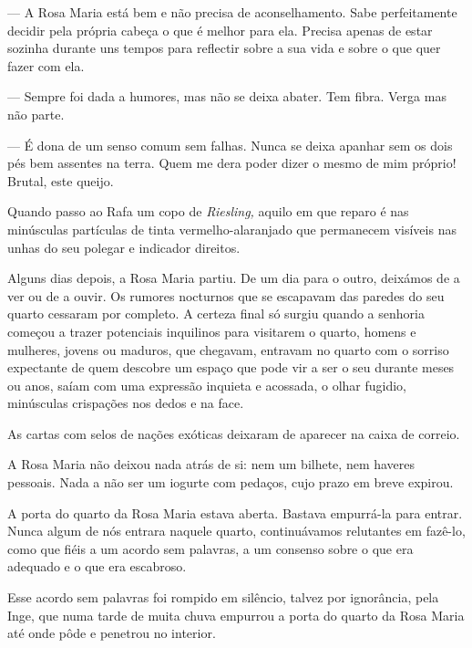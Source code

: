 --- A Rosa Maria está bem e não precisa de aconselhamento. Sabe
  perfeitamente decidir pela própria cabeça o que é melhor para ela.
  Precisa apenas de estar sozinha durante uns tempos para reflectir
  sobre a sua vida e sobre o que quer fazer com ela.

--- Sempre foi dada a humores, mas não se deixa abater.
Tem fibra. Verga mas não parte.

--- É dona de um senso comum sem falhas. Nunca se deixa apanhar sem os
  dois pés bem assentes na terra. Quem me dera poder dizer o mesmo de
  mim próprio! Brutal, este queijo.

Quando passo ao Rafa um copo de \emph{Riesling, }aquilo em que reparo é
nas minúsculas partículas de tinta vermelho-alaranjado que permanecem
visíveis nas unhas do seu polegar e indicador direitos.


\medskip
\asterisc
\medskip

Alguns dias depois, a Rosa Maria partiu. De um dia para o outro,
deixámos de a ver ou de a ouvir. Os rumores nocturnos que se escapavam
das paredes do seu quarto cessaram por completo. A certeza final só
surgiu quando a senhoria começou a trazer potenciais inquilinos para
visitarem o quarto, homens e mulheres, jovens ou maduros, que chegavam, entravam no quarto com o
sorriso expectante de quem descobre um espaço que pode vir a ser o seu
durante meses ou anos, saíam com uma expressão inquieta e acossada, o
olhar fugidio, minúsculas crispações nos dedos e na face.

As cartas com selos de nações exóticas deixaram de aparecer na caixa de
correio.

A Rosa Maria não deixou nada atrás de si: nem um bilhete, nem haveres
pessoais. Nada a não ser um iogurte com pedaços, cujo prazo em breve
expirou.

A porta do quarto da Rosa Maria estava aberta. Bastava empurrá-la para
entrar. Nunca algum de nós entrara naquele quarto, continuávamos
relutantes em fazê-lo, como que fiéis a um acordo sem palavras, a um
consenso sobre o que era adequado e o que era escabroso.

Esse acordo sem palavras foi rompido em silêncio, talvez por ignorância,
pela Inge, que numa tarde de muita chuva empurrou a porta do quarto da
Rosa Maria até onde pôde e penetrou no interior.

